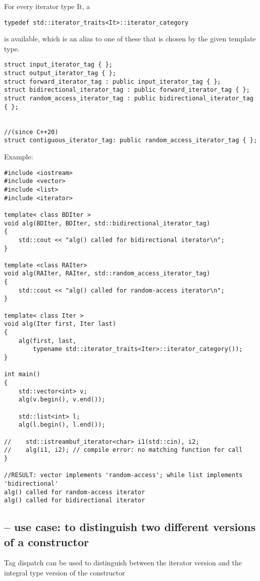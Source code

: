 For every iterator type It, a 
\begin{verbatim}
typedef std::iterator_traits<It>::iterator_category 
\end{verbatim}
is available, which is an alias to
one of these that is chosen by the given template type.

\begin{lstlisting}
struct input_iterator_tag { };
struct output_iterator_tag { };
struct forward_iterator_tag : public input_iterator_tag { };
struct bidirectional_iterator_tag : public forward_iterator_tag { };
struct random_access_iterator_tag : public bidirectional_iterator_tag { };


//(since C++20)
struct contiguous_iterator_tag: public random_access_iterator_tag { };
\end{lstlisting}


Example:
\begin{verbatim}
#include <iostream>
#include <vector>
#include <list>
#include <iterator>
 
template< class BDIter >
void alg(BDIter, BDIter, std::bidirectional_iterator_tag)
{
    std::cout << "alg() called for bidirectional iterator\n";
}
 
template <class RAIter>
void alg(RAIter, RAIter, std::random_access_iterator_tag)
{
    std::cout << "alg() called for random-access iterator\n";
}
 
template< class Iter >
void alg(Iter first, Iter last)
{
    alg(first, last,
        typename std::iterator_traits<Iter>::iterator_category());
}
 
int main()
{
    std::vector<int> v;
    alg(v.begin(), v.end());
 
    std::list<int> l;
    alg(l.begin(), l.end());
 
//    std::istreambuf_iterator<char> i1(std::cin), i2;
//    alg(i1, i2); // compile error: no matching function for call
}

//RESULT: vector implements 'random-access'; while list implements 'bidirectional'
alg() called for random-access iterator
alg() called for bidirectional iterator
\end{verbatim}


\subsection{-- use case: to distinguish two different versions of a constructor}

Tag dispatch can be used to distinguish between the iterator version and the
integral type version of the constructor

